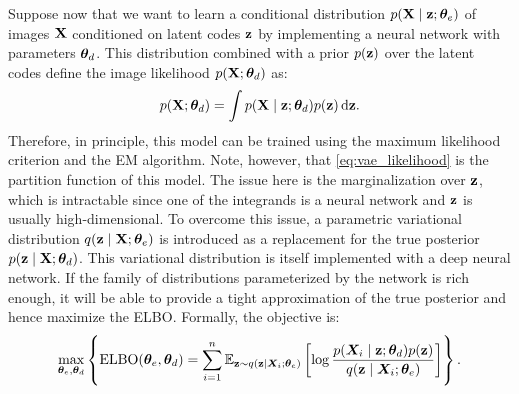 Suppose now that we want to learn a conditional distribution $p({\mathbf{X}} \mid {\mathbf{z}}; {\bm{\theta}}_e)$ of images ${\mathbf{X}}$ conditioned on latent codes ${\mathbf{z}}$ by implementing a neural network with parameters ${\bm{\theta}}_d$. This distribution combined with a prior $p({\mathbf{z}})$ over the latent codes define the image likelihood $p({\mathbf{X}}; {\bm{\theta}}_d)$ as:
\begin{equation}
    \label{eq:vae_likelihood}
    p({\mathbf{X}}; {\bm{\theta}}_d) = \int p({\mathbf{X}} \mid {\mathbf{z}}; {\bm{\theta}}_d) p({\mathbf{z}}) {\,\text{d}} {\mathbf{z}}.
\end{equation}
Therefore, in principle, this model can be trained using the maximum likelihood criterion and the EM algorithm. Note, however, that \eqref{eq:vae_likelihood} is the partition function of this model. The issue here is the marginalization over ${\mathbf{z}}$, which is intractable since one of the integrands is a neural network and ${\mathbf{z}}$ is usually high-dimensional. To overcome this issue, a parametric variational distribution $q({\mathbf{z}} \mid {\mathbf{X}}; {\bm{\theta}}_e)$ is introduced as a replacement for the true posterior $p({\mathbf{z}} \mid {\mathbf{X}}; {\bm{\theta}}_d)$. This variational distribution is itself implemented with a deep neural network. If the family of distributions parameterized by the network is rich enough, it will be able to provide a tight approximation of the true posterior and hence maximize the ELBO. Formally, the objective is:
\begin{equation}
    \max_{{\bm{\theta}}_e, {\bm{\theta}}_d} \left\lbrace \mathrm{ELBO}({\bm{\theta}}_e, {\bm{\theta}}_d) = \sum_{i=1}^n \mathbb{E}_{{\mathbf{z}} \sim q({\mathbf{z}} \mid {\bm{X}}_i; {\bm{\theta}}_e)} \left[ \log \frac{p({\bm{X}}_i \mid {\mathbf{z}}; {\bm{\theta}}_d)p({\mathbf{z}})}{q({\mathbf{z}} \mid {\bm{X}}_i; {\bm{\theta}}_e)} \right] \right\rbrace.
\end{equation}

